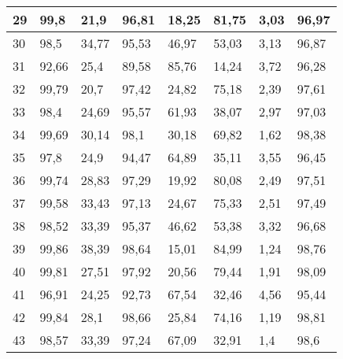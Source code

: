 \begin{longtable}[c]{|l|l|l|l|l|l|l|l|}
29              & 99,8         & 21,9         & 96,81       & 18,25         & 81,75         & 3,03          & 96,97         \\ \hline
30              & 98,5         & 34,77        & 95,53       & 46,97         & 53,03         & 3,13          & 96,87         \\ \hline
31              & 92,66        & 25,4         & 89,58       & 85,76         & 14,24         & 3,72          & 96,28         \\ \hline
32              & 99,79        & 20,7         & 97,42       & 24,82         & 75,18         & 2,39          & 97,61         \\ \hline
33              & 98,4         & 24,69        & 95,57       & 61,93         & 38,07         & 2,97          & 97,03         \\ \hline
34              & 99,69        & 30,14        & 98,1        & 30,18         & 69,82         & 1,62          & 98,38         \\ \hline
35              & 97,8         & 24,9         & 94,47       & 64,89         & 35,11         & 3,55          & 96,45         \\ \hline
36              & 99,74        & 28,83        & 97,29       & 19,92         & 80,08         & 2,49          & 97,51         \\ \hline
37              & 99,58        & 33,43        & 97,13       & 24,67         & 75,33         & 2,51          & 97,49         \\ \hline
38              & 98,52        & 33,39        & 95,37       & 46,62         & 53,38         & 3,32          & 96,68         \\ \hline
39              & 99,86        & 38,39        & 98,64       & 15,01         & 84,99         & 1,24          & 98,76         \\ \hline
40              & 99,81        & 27,51        & 97,92       & 20,56         & 79,44         & 1,91          & 98,09         \\ \hline
41              & 96,91        & 24,25        & 92,73       & 67,54         & 32,46         & 4,56          & 95,44         \\ \hline
42              & 99,84        & 28,1         & 98,66       & 25,84         & 74,16         & 1,19          & 98,81         \\ \hline
43              & 98,57        & 33,39        & 97,24       & 67,09         & 32,91         & 1,4           & 98,6          \\ \hline

\end{longtable}
